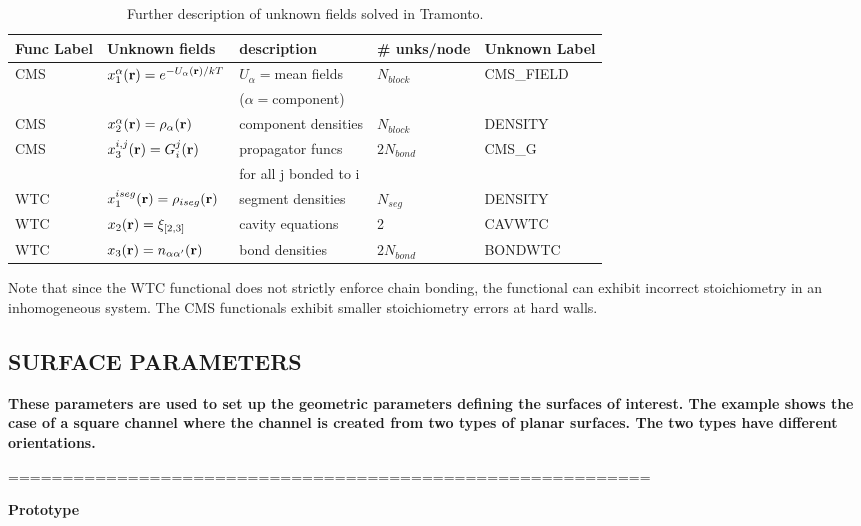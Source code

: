\documentclass[10pt,onecolumn]{article}
\begin{document}
\begin{table}[h]
\center\begin{tabular}{|l|l|l|l|l|} \hline
Func Label & Unknown fields & description & \# unks/node & Unknown Label \\ \hline 
CMS & $x_1^\alpha({\bf r}) = e^{-U_\alpha({\bf r})/kT}$ & $U_\alpha=$mean fields  & $N_{block}$ & CMS\_FIELD \\
&&($\alpha=$component)&& \\
\hline
CMS & $x_2^\alpha({\bf r}) = \rho_\alpha({\bf r})$ & component densities & $N_{block}$ & DENSITY \\ \hline
CMS & $x_3^{i,j}({\bf r}) = G_i^j({\bf r})$& propagator funcs & $2N_{bond}$ & CMS\_G \\
& & for all j bonded to i & & \\ \hline \hline
WTC &  $x_1^{iseg}({\bf r})=\rho_{iseg}({\bf r})$ & segment densities& $N_{seg}$& DENSITY \\ \hline
WTC & $x_2({\bf r})=\xi_{[2,3]}$& cavity equations& 2 & CAVWTC\\ \hline
WTC & $x_3({\bf r})=n_{\alpha \alpha'}({\bf r})$ & bond densities & $2N_{bond}$ & BONDWTC\\ \hline
 \end{tabular}
\caption{Further description of unknown fields solved in Tramonto.}
\label{tab:polyoptions2}
\end{table}

\noindent Note that since the WTC functional does not strictly enforce chain bonding, the functional can exhibit incorrect stoichiometry in an inhomogeneous system.  The CMS functionals exhibit smaller stoichiometry errors at hard walls.  

\vfill
\break

\subsection{SURFACE PARAMETERS}
{\bf
These parameters are used to set up the geometric parameters
defining the surfaces of interest.  The example shows the
case of a square channel where the channel is created from two
types of planar surfaces.  The two types have different
orientations.}

\vspace{0.1in}
\noindent===========================================================

{\bf Prototype}
\end{document}
